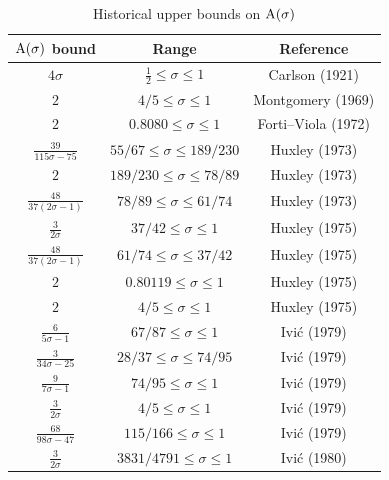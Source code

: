 \begin{table}[ht]
    \def\arraystretch{1.3}
    \centering
    \caption{Historical upper bounds on $\mathrm{A}(\sigma)$}
    \begin{tabular}{|c|c|c|}
    \hline
    $\mathrm{A}(\sigma)$ bound & Range & Reference\\
    \hline
    $4\sigma$ & $\frac{1}{2} \leq \sigma \le 1$ & Carlson (1921) \cite{carlson_uber_1921}\\
    \hline
    $2$ & $4/5 \leq \sigma \leq 1$ & Montgomery (1969) \cite{montgomery_1969} \\
    \hline
    $2$ & $0.8080 \leq \sigma \leq 1$ & Forti--Viola (1972) \cite{forti-viola} \\
    \hline
    $\frac{39}{115\sigma-75}$ & $55/67 \leq \sigma \leq 189/230$ & Huxley (1973) \cite{huxley_large_1973} \\
    \hline
    $2$ & $189/230 \leq \sigma \leq 78/89$ & Huxley (1973) \cite{huxley_large_1973} \\
    \hline
    $\frac{48}{37(2\sigma-1)}$ & $78/89 \leq \sigma \leq 61/74$ & Huxley (1973) \cite{huxley_large_1973} \\
    \hline
    $\frac{3}{2\sigma}$ & $37/42 \leq \sigma \leq 1$ & Huxley (1975) \cite{huxley_large_1975a}\\
    \hline
    $\frac{48}{37(2\sigma-1)}$ & $61/74 \leq \sigma \leq 37/42$ & Huxley (1975) \cite{huxley_large_1975a}\\
    \hline
    $2$ & $0.80119 \leq \sigma \leq 1$ & Huxley (1975) \cite{huxley_large_1975a}\\
    \hline
    $2$ & $4/5 \leq \sigma \leq 1$ & Huxley (1975) \cite{huxley_large_1975b}\\
    \hline
    $\frac{6}{5\sigma-1}$ & $67/87 \leq \sigma \leq 1$ & Ivi\'c (1979) \cite{ivic_note_1979} \\
    \hline
    $\frac{3}{34\sigma-25}$ & $28/37 \leq \sigma \leq 74/95$ & Ivi\'c (1979) \cite{ivic_note_1979} \\
    \hline
    $\frac{9}{7\sigma-1}$ & $74/95 \leq \sigma \leq 1$ & Ivi\'c (1979) \cite{ivic_note_1979} \\
    \hline
    $\frac{3}{2\sigma}$ & $4/5 \leq \sigma \leq 1$ & Ivi\'c (1979) \cite{ivic_note_1979} \\
    \hline
    $\frac{68}{98\sigma-47}$ & $115/166 \leq \sigma \leq 1$ & Ivi\'c (1979) \cite{ivic_note_1979} \\
    \hline
    $\frac{3}{2\sigma}$ & $3831/4791 \leq \sigma \leq 1$ & Ivi\'c (1980) \cite{ivic_exponent_pairs}  \\

\end{tabular}
\end{table}

